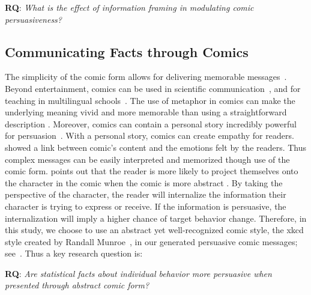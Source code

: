 \textbf{RQ}: \textit{What is the effect of information framing in modulating comic persuasiveness?}

\subsection{Communicating Facts through Comics}
The simplicity of the comic form allows for delivering memorable messages~\cite{scott1993understanding}. Beyond entertainment, comics can be used in scientific communication~\cite{McDermottPB18}, and for teaching in multilingual schools~\cite{cary2004going}.
The use of metaphor in comics can make the underlying meaning vivid and more memorable than using a straightforward description \cite{McDermottPB18,scott1993understanding}. Moreover, comics can contain a personal story incredibly powerful for persuasion~\cite{weaver2017losing}. With a personal story, comics can create empathy for readers.~\textcite{matsubara2016emotional} showed a link between comic's content and the emotions felt by the readers. Thus complex messages can be easily interpreted and memorized though use of the comic form. \textcite{scott1993understanding} points out that the reader is more likely to project themselves onto the character in the comic when the comic is more abstract \cite{scott1993understanding}. By taking the perspective of the character, the reader will internalize the information their character is trying to express or receive. If the information is persuasive, the internalization will imply a higher chance of target behavior change. Therefore, in this study, we choose to use an abstract yet well-recognized comic style, the xkcd style created by Randall Munroe~\cite{munroe2009xkcd}, in our generated persuasive comic messages; see~. Thus a key research question is:

\textbf{RQ}: \textit{Are statistical facts about individual behavior more persuasive when presented through abstract comic form?}

